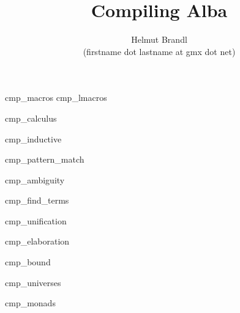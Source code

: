 \documentclass[12pt]{article}
\begin{document}


\title{
    Compiling Alba
}

\author{
    Helmut Brandl
    \\
    \scriptsize (firstname dot lastname at gmx dot net)
}
\date{}

\maketitle




\tableofcontents

 {cmp_macros}
 {cmp_lmacros}

\lstset{language=alba}

 {cmp_calculus}

 {cmp_inductive}

 {cmp_pattern_match}

 {cmp_ambiguity}

 {cmp_find_terms}

 {cmp_unification}

 {cmp_elaboration}

 {cmp_bound}

 {cmp_universes}

 {cmp_monads}
\end{document}
